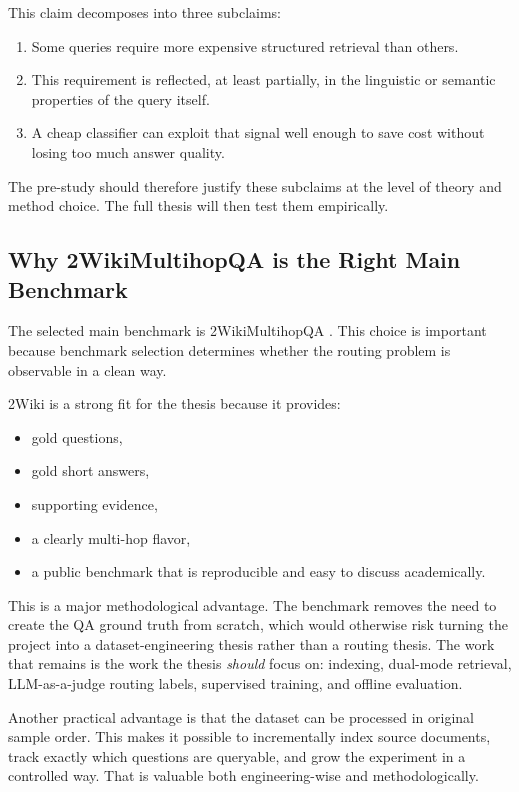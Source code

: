 \documentclass[11pt, a4paper]{article}
\begin{document}
This claim decomposes into three subclaims:
\begin{enumerate}[leftmargin=*, label=\arabic*.]
    \item Some queries require more expensive structured retrieval than others.
    \item This requirement is reflected, at least partially, in the linguistic or semantic properties of the query itself.
    \item A cheap classifier can exploit that signal well enough to save cost without losing too much answer quality.
\end{enumerate}

The pre-study should therefore justify these subclaims at the level of theory and method choice. The full thesis will then test them empirically.

\subsection{Why 2WikiMultihopQA is the Right Main Benchmark}

The selected main benchmark is 2WikiMultihopQA \cite{ho2020twowiki}. This choice is important because benchmark selection determines whether the routing problem is observable in a clean way.

2Wiki is a strong fit for the thesis because it provides:
\begin{itemize}[label=--]
    \item gold questions,
    \item gold short answers,
    \item supporting evidence,
    \item a clearly multi-hop flavor,
    \item a public benchmark that is reproducible and easy to discuss academically.
\end{itemize}

This is a major methodological advantage. The benchmark removes the need to create the QA ground truth from scratch, which would otherwise risk turning the project into a dataset-engineering thesis rather than a routing thesis. The work that remains is the work the thesis \emph{should} focus on: indexing, dual-mode retrieval, LLM-as-a-judge routing labels, supervised training, and offline evaluation.

Another practical advantage is that the dataset can be processed in original sample order. This makes it possible to incrementally index source documents, track exactly which questions are queryable, and grow the experiment in a controlled way. That is valuable both engineering-wise and methodologically.
\end{document}
